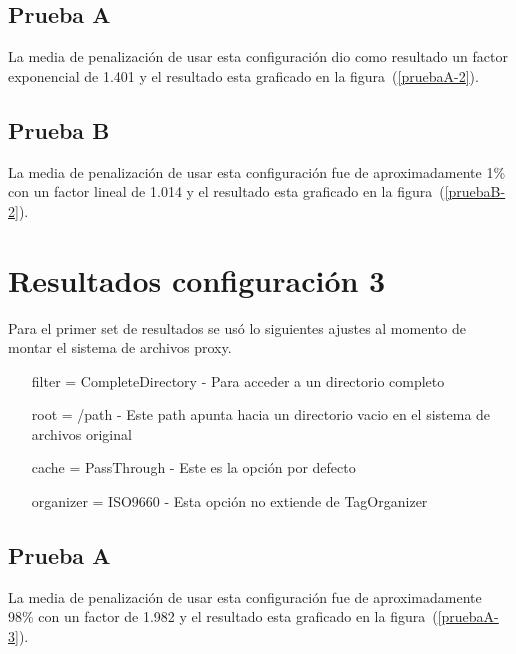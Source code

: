 \subsection{Prueba A}

La media de penalización de usar esta configuración dio como resultado un factor exponencial de 1.401 y el resultado esta graficado en la figura~(\ref{pruebaA-2}).


\subsection{Prueba B}

La media de penalización de usar esta configuración fue de aproximadamente 1\% con un factor lineal de 1.014 y el resultado esta graficado en la figura~(\ref{pruebaB-2}).


\section{Resultados configuración 3}

Para el primer set de resultados se usó lo siguientes ajustes al momento de montar el sistema de archivos proxy.

\begin{itemize}
\item[filter] = CompleteDirectory - Para acceder a un directorio completo
\item[root] = /path - Este path apunta hacia un directorio vacio en el sistema de archivos original
\item[cache] = PassThrough - Este es la opción por defecto
\item[organizer] = ISO9660 - Esta opción no extiende de TagOrganizer
\end{itemize}

\subsection{Prueba A}

La media de penalización de usar esta configuración fue de aproximadamente 98\% con un factor de 1.982 y el resultado esta graficado en la figura~(\ref{pruebaA-3}).


